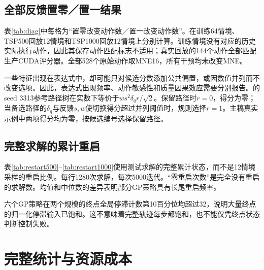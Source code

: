 \documentclass[runningheads,orivec]{llncs}
\begin{document}
\subsection{全部反馈置零／置一结果}
表\ref{tab:diag}中每格为“置零改变动作数／置一改变动作数”。在训练64情境、TSP500回放12情境和TSP1000回放12情境上分别计算。训练情境没有对应的历史实际执行动作，因此其保存动作匹配标志不适用；真实回放的144个动作全部匹配生产CUDA评分器。全部528个原始动作取MNE16，所有干预均未改变MNE。
\begin{table}[htbp]\caption{冻结状态反馈干预，不重新运行ACO。}\label{tab:diag}
\centering\small{}\end{table}
一些特征出现在表达式中，却可能只对候选分数添加公共偏置，或因数值并列而不改变选项。因此，表达式出现频率、动作敏感性和质量因果效应需要分别报告。\CT{}的seed 3313参考路径树在实数下等价于$ws^2\delta_q r/\sqrt2$。保留路径时$r=0$，得分为零；当备选路径的$\delta_q$与反馈$s,w$使切换得分超过并列阈值时，规则选择$r=1$。主稿真实示例中两项得分均为零，按候选编号选择保留路径。

\subsection{完整求解的累计重启}
表\ref{tab:restart500}--\ref{tab:restart1000}使用测试求解的完整累计状态，而不是12情境采样的重启比例。每行1280次求解，每次5000迭代。“零重启次数”是完全没有重启的求解数。均值和中位数的差异表明部分GP策略具有长尾重启频率。
\begin{table}[htbp]\caption{TSP500累计重启次数。}\label{tab:restart500}
\centering\small{}\end{table}
\begin{table}[htbp]\caption{TSP1000累计重启次数。}\label{tab:restart1000}
\centering\small{}\end{table}
六个GP策略在两个规模的终点全局停滞计数第10百分位均超过32，说明大量终点的归一化停滞输入已饱和。这不意味着完整轨迹每步都饱和，也不能仅凭终点状态判断控制失败。

\section{完整统计与资源成本}
\end{document}
